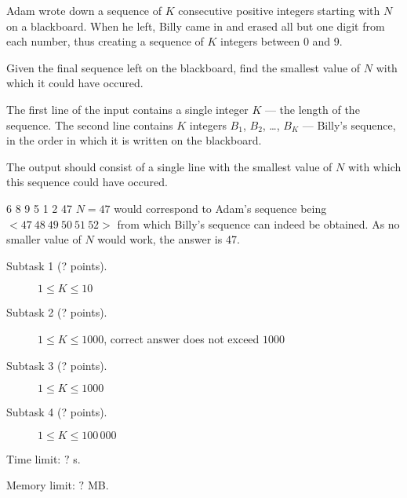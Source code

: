 \documentclass{boi2014}
\begin{document}
    Adam wrote down a sequence of $K$ consecutive positive integers starting
    with $N$ on a blackboard. When he left, Billy came in and erased all but one
    digit from each number, thus creating a sequence of $K$ integers between 0
    and 9.

    \Task

    Given the final sequence left on the blackboard, find the smallest
    value of $N$ with which it could have occured.

    \Input

    The first line of the input contains a single integer $K$ --- the length of
    the sequence. The second line contains $K$ integers $B_1$, $B_2$, \dots,
    $B_K$ --- Billy's sequence, in the order in which it is written on the
    blackboard.

    \Output

    The output should consist of a single line with the smallest value of
    $N$ with which this sequence could have occured.

    \Example

    \example
    {
        6 8 9 5 1 2
    }
    {
        47
    }
    {
        $N = 47$ would correspond to Adam's sequence
        being $<47\ 48\ 49\ 50\ 51\ 52>$ from which Billy's sequence
        can indeed be obtained. As no smaller value of $N$
        would work, the answer is 47.
    }

\Scoring

\begin{description}
    \item[Subtask 1 (? points).] $1 \le K \le 10$
    \item[Subtask 2 (? points).] $1 \le K \le 1000$, correct
        answer does not exceed $1000$
    \item[Subtask 3 (? points).] $1 \le K \le 1000$
    \item[Subtask 4 (? points).] $1 \le K \le 100\,000$
\end{description}

\Constraints

Time limit: $?$ s.

Memory limit: $?$ MB.
\end{document}
